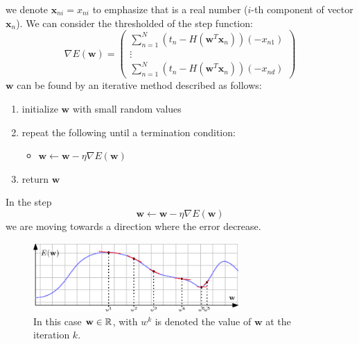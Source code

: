\documentclass[10pt, letterpaper]{report}
\begin{document}
we denote $\mathbf x_{ni}=x_{ni}$  to emphasize that is a real number ($i$-th component of vector $\mathbf x_n$). We can consider the thresholded of the step function:\begin{equation}
	\nabla E(\mathbf w)=\begin{pmatrix}
		\sum_{n=1}^N(t_n-H(\mathbf w^T\mathbf x_n))(- x_{n1}) \\
		\vdots                                                \\
		\sum_{n=1}^N(t_n-H(\mathbf w^T\mathbf x_n))(- x_{nd})
	\end{pmatrix}
\end{equation}
$\mathbf w$ can be found by an iterative method described as follows:\begin{enumerate}
	\item initialize $\mathbf w$ with small random values
	\item repeat the following until a termination condition:\begin{itemize}
		      \item $\mathbf w\leftarrow \mathbf w-\eta\nabla E(\mathbf w)$
	      \end{itemize}
	\item return $\mathbf w$
\end{enumerate}
In the step $$\mathbf w\leftarrow \mathbf w-\eta\nabla E(\mathbf w)$$
we are moving towards a direction where the error decrease.

\begin{figure}[h!]
	\centering
	\includegraphics[width=0.7\textwidth]{images/grad_desc.eps}
	\caption{In this case $\mathbf w\in {\mathbb R}$, with $w^k$ is denoted the value of $\mathbf w$ at the iteration $k$.}
	\label{fig:grad}
\end{figure}
\end{document}
